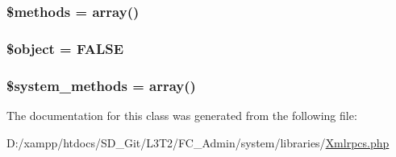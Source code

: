 \subsubsection[{\$methods}]{\setlength{\rightskip}{0pt plus 5cm}\$methods = array()}\label{class_c_i___xmlrpcs_a802753499268a04da139bd6e6ef89b35}
\hypertarget{class_c_i___xmlrpcs_a52123b83a1952a68c5513e47d59ec4a6}{}
\subsubsection[{\$object}]{\setlength{\rightskip}{0pt plus 5cm}\$object = F\+A\+L\+S\+E}\label{class_c_i___xmlrpcs_a52123b83a1952a68c5513e47d59ec4a6}
\hypertarget{class_c_i___xmlrpcs_a07c837152d76c5e72b0bd7a065fa9c10}{}
\subsubsection[{\$system\+\_\+methods}]{\setlength{\rightskip}{0pt plus 5cm}\$system\+\_\+methods = array()}\label{class_c_i___xmlrpcs_a07c837152d76c5e72b0bd7a065fa9c10}


The documentation for this class was generated from the following file\+:\begin{DoxyCompactItemize}
\item 
D\+:/xampp/htdocs/\+S\+D\+\_\+\+Git/\+L3\+T2/\+F\+C\+\_\+\+Admin/system/libraries/\hyperlink{_xmlrpcs_8php}{Xmlrpcs.\+php}\end{DoxyCompactItemize}
